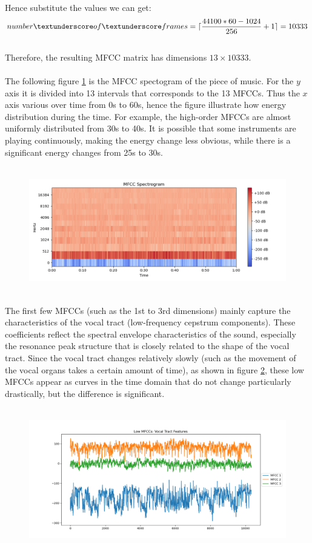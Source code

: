 Hence substitute the values we can get:\\
$$
number\textunderscore of\textunderscore frames=\lceil \frac{44100*60-1024}{256}+1\rceil=10333
$$\\
Therefore, the resulting MFCC matrix has dimensions $13\times 10333$.\\
\\
The following figure \ref{fig:MFCC Example} is the MFCC spectogram of the piece of music. For the $y$ axis it is divided into 13 intervals that corresponds to the 13 MFCCs. Thus the $x$ axis various over time from 0s to 60s, hence the figure illustrate how energy distribution during the time. For example, the high-order MFCCs are almost uniformly distributed from 30s to 40s. It is possible that some instruments are playing continuously, making the energy change less obvious, while there is a significant energy changes from 25s to 30s. \\
\\
\begin{figure}
	\centering
	\includegraphics[width=0.9\linewidth]{../Statistical_Sciences_template/figure/MFCC Example.png}
	\caption{}
	\label{fig:MFCC Example}
\end{figure}\\
The first few MFCCs (such as the 1st to 3rd dimensions) mainly capture the characteristics of the vocal tract (low-frequency cepstrum components). These coefficients reflect the spectral envelope characteristics of the sound, especially the resonance peak structure that is closely related to the shape of the vocal tract. Since the vocal tract changes relatively slowly (such as the movement of the vocal organs takes a certain amount of time), as shown in figure \ref{fig:Low MFCCs}, these low MFCCs appear as curves in the time domain that do not change particularly drastically, but the difference is significant.\\
\\
\begin{figure}[h!]
	\centering
	\includegraphics[width=0.9\linewidth]{../Statistical_Sciences_template/figure/Low MFCCs.png}
	\caption{}
	\label{fig:Low MFCCs}
\end{figure}\\
